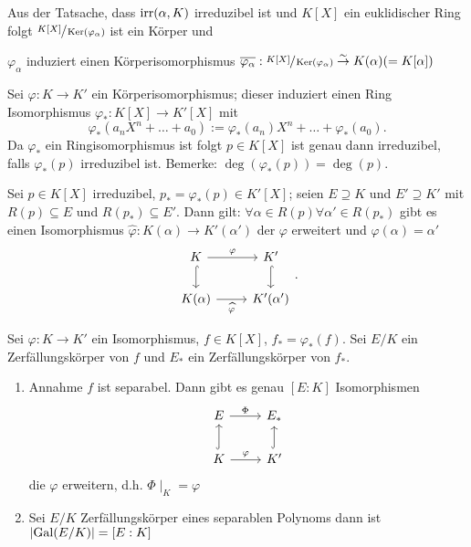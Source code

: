 Aus der Tatsache, dass $\operatorname{irr}(\alpha,K)$ irreduzibel ist und $K[X]$ ein euklidischer Ring folgt $\sfrac{K[X]}{\operatorname{Ker}(\varphi_{\alpha})}$ ist ein Körper und
\begin{lemma}
	$\varphi_{\alpha}$ induziert einen Körperisomorphismus $\overline{\varphi_{\alpha}}: \sfrac{K[X]}{\operatorname{Ker}(\varphi_{\alpha})} \overset{\sim}{\to} K(\alpha) (= K[\alpha])$
\end{lemma}

Sei $\varphi: K \to K'$ ein Körperisomorphismus; dieser induziert einen Ring Isomorphismus $\varphi_{*}: K[X] \to K'[X]$ mit
\[
	\varphi_{*}(a_{n}X^{n} + \ldots + a_0) := \varphi_{*}(a_{n}) X^{n} + \ldots + \varphi_{*}(a_{0})
.\] 
Da $\varphi_{*}$ ein Ringisomorphismus ist folgt $p \in K[X]$ ist genau dann irreduzibel, falls $\varphi_{*}(p)$ irreduzibel ist.
Bemerke: $\deg(\varphi_{*}(p)) = \deg(p)$.

\begin{lemma}
	Sei $p \in K[X]$ irreduzibel, $p_{*} = \varphi_{*}(p) \in K'[X]$; seien $E \supseteq K$ und $E' \supseteq K'$ mit $R(p) \subseteq E$ und $R(p_{*}) \subseteq E'$.
	Dann gilt: $\forall \alpha \in R(p) \forall \alpha' \in R(p_{*})$ gibt es einen Isomorphismus $\widehat{\varphi}: K(\alpha) \to K'(\alpha')$ der $\varphi$ erweitert
	und $\widehat{\varphi}(\alpha) = \alpha'$
	\[
		\begin{tikzcd}
			K \arrow[r, "\varphi"] \arrow[d, hook]    & K' \arrow[d, hook] \\
			K(\alpha) \arrow[r, "\widehat{\varphi}"'] & K'(\alpha')       
		\end{tikzcd}
	.\]
\end{lemma}


\begin{theorem}
	Sei $\varphi: K \to K'$ ein Isomorphismus, $f \in K[X]$, $f_{*} = \varphi_{*}(f)$.
	Sei $E / K$ ein Zerfällungskörper von $f$ und $E_{*}$ ein Zerfällungskörper von $f_{*}$.
	\begin{enumerate}[(1)]
		\item Annahme $f$ ist separabel. Dann gibt es genau $[E:K]$ Isomorphismen 
			\[
				\begin{tikzcd}
					E \arrow[r, "\Phi"]                    & E_*                \\
					K \arrow[r, "\varphi"] \arrow[u, hook] & K' \arrow[u, hook]
				\end{tikzcd}
			\]
			die $\varphi$ erweitern, d.h. $\Phi \mid_{K} = \varphi$
		\item Sei $E / K$ Zerfällungskörper eines separablen Polynoms dann ist $\abs{\operatorname{Gal}(E / K)} = [E:K]$ 
	\end{enumerate}
\end{theorem}


